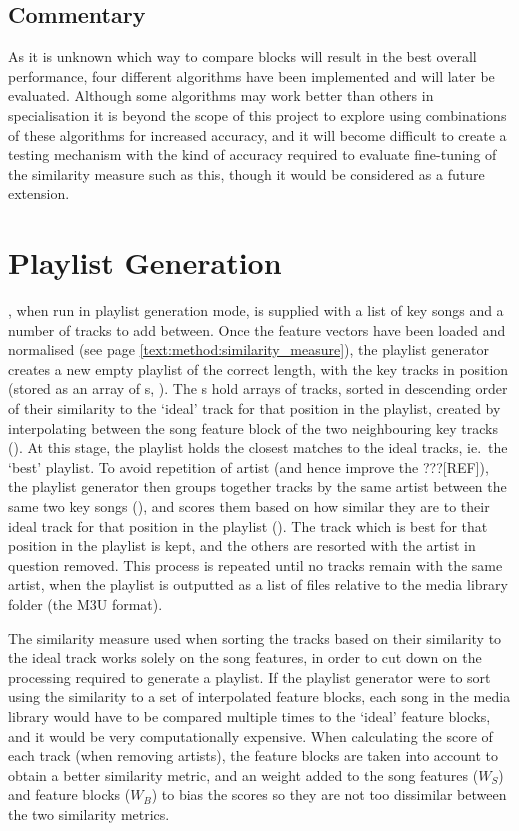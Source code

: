 \subsection{Commentary}
As it is unknown which way to compare blocks will result in the best overall performance, four different algorithms have been implemented and will later be evaluated. Although some algorithms may work better than others in specialisation it is beyond the scope of this project to explore using combinations of these algorithms for increased accuracy, and it will become difficult to create a testing mechanism with the kind of accuracy required to evaluate fine-tuning of the similarity measure such as this, though it would be considered as a future extension.
\section{Playlist Generation}
, when run in playlist generation mode, is supplied with a list of key songs and a number of tracks to add between. Once the feature vectors have been loaded and normalised (see page \ref{text:method:similarity_measure}), the playlist generator creates a new empty playlist of the correct length, with the key tracks in position (stored as an array of s, ). The s hold arrays of tracks, sorted in descending order of their similarity to the `ideal' track for that position in the playlist, created by interpolating between the song feature block of the two neighbouring key tracks (). At this stage, the playlist holds the closest matches to the ideal tracks, ie.\ the `best' playlist. To avoid repetition of artist (and hence improve the ???[REF]), the playlist generator then groups together tracks by the same artist between the same two key songs (), and scores them based on how similar they are to their ideal track for that position in the playlist (). The track which is best for that position in the playlist is kept, and the others are resorted with the artist in question removed. This process is repeated until no tracks remain with the same artist, when the playlist is outputted as a list of files relative to the media library folder (the M3U format).

The similarity measure used when sorting the tracks based on their similarity to the ideal track works solely on the song features, in order to cut down on the processing required to generate a playlist. If the playlist generator were to sort using the similarity to a set of interpolated feature blocks, each song in the media library would have to be compared multiple times to the `ideal' feature blocks, and it would be very computationally expensive. When calculating the score of each track (when removing artists), the feature blocks are taken into account to obtain a better similarity metric, and an weight added to the song features ($W_S$) and feature blocks ($W_B$) to bias the scores so they are not too dissimilar between the two similarity metrics.

